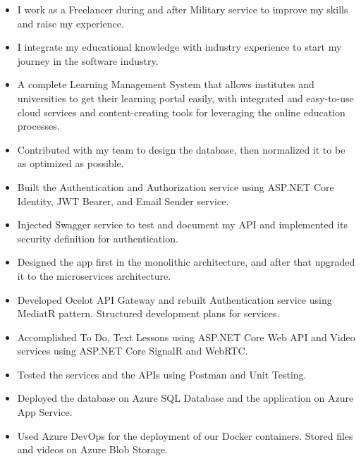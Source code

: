 \documentclass[10pt,a4paper,ragged2e,withhyper]{altacv}
\begin{document}
\begin{paracol}{2}




\begin{itemize}
    \item I work as a Freelancer during and after Military service to improve my skills and raise my experience.
    \item I integrate my educational knowledge with industry experience to start my journey in the software industry.
\end{itemize}


\begin{itemize}
    \item A complete Learning Management System that allows institutes and universities to get their learning portal easily, with integrated and easy-to-use cloud services and content-creating tools for leveraging the online education processes.
    \item Contributed with my team to design the database, then normalized it to be as optimized as possible.
    \item Built the Authentication and Authorization service using ASP.NET Core Identity, JWT Bearer, and Email Sender service.
    \item Injected Swagger service to test and document my API and implemented its security definition for authentication.
    \item Designed the app first in the monolithic architecture, and after that upgraded it to the microservices architecture.
    \item Developed Ocelot API Gateway and rebuilt Authentication service using MediatR pattern. Structured development plans for services.
    \item Accomplished To Do, Text Lessons using ASP.NET Core Web API and Video services using ASP.NET Core SignalR and WebRTC.
    \item Tested the services and the APIs using Postman and Unit Testing.
    \item Deployed the database on Azure SQL Database and the application on Azure App Service.
    \item Used Azure DevOps for the deployment of our Docker containers. Stored files and videos on Azure Blob Storage.
\end{itemize}


\end{paracol}
\end{document}
